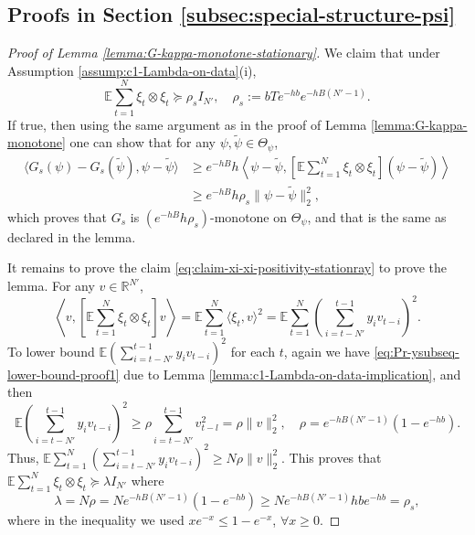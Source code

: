 \documentclass[11pt]{article}
\theoremstyle{remark}
\theoremstyle{plain}
\newcommand{\E}{\mathbb{E}}
\newcommand{\R}{\mathbb{R}}
\begin{document}
\subsection{Proofs in Section \ref{subsec:special-structure-psi}}
%
\begin{proof}[Proof of Lemma \ref{lemma:G-kappa-monotone-stationary}]
We claim that under Assumption \ref{assump:c1-Lambda-on-data}(i),
\begin{equation}\label{eq:claim-xi-xi-positivity-stationray}
\E  \sum_{t= 1}^N \xi_t \otimes \xi_t \succeq  \rho_s I_{N'},
\quad \rho_s := bT e^{-hb} e^{-hB (N'-1)}.
\end{equation}
If true, then using the same argument as in the proof of Lemma \ref{lemma:G-kappa-monotone} one can show that for any $\psi, \tilde \psi \in \Theta_\psi$,
\begin{align*}
\langle G_s(\psi) - G_s(\tilde \psi), \psi - \tilde \psi \rangle
& \ge e^{-hB} h  \left\langle  \psi - \tilde \psi,  \left[ \E \sum_{t=1}^N   \xi_t  \otimes \xi_t \right] (\psi - \tilde \psi) \right\rangle \\
& \ge e^{-hB} h  \rho_s \| \psi - \tilde \psi \|_2^2,
\end{align*}
which proves that $ G_s$ is $(e^{-hB} h  \rho_s)$-monotone on $\Theta_\psi$, and that is the same as declared in the lemma.

It remains to prove the claim \eqref{eq:claim-xi-xi-positivity-stationray} to prove the lemma. For any $v \in \R^{N'}$,
\[
\left\langle v,  \left[ \E  \sum_{t= 1}^N \xi_t \otimes \xi_t  \right] v \right\rangle
= \E \sum_{t=1}^N \langle \xi_t, v\rangle^2
= \E \sum_{t=1}^N \left(  \sum_{ i = t- N' }^{t-1}  y_i  v_{t-i} \right)^2.
\]
To lower bound $\E \left(  \sum_{ i = t- N' }^{t-1}  y_i  v_{t-i} \right)^2$ for each $t$,
again we have \eqref{eq:Pr-ysubseq-lower-bound-proof1} due to Lemma \ref{lemma:c1-Lambda-on-data-implication},
and then
\[
\E \left(  \sum_{ i = t- N' }^{t-1}  y_i  v_{t-i} \right)^2
\ge \rho \sum_{ i = t- N' }^{t-1} v_{t-l}^2
= \rho \| v\|_2^2,
\quad \rho = e^{-hB(N'-1)} (1- e^{-hb}) .
\]
Thus,
$\E \sum_{t=1}^N \left(  \sum_{ i = t- N' }^{t-1}  y_i  v_{t-i} \right)^2
\ge N \rho \| v\|_2^2 $.
This proves that $\E  \sum_{t= 1}^N \xi_t \otimes \xi_t \succeq \lambda I_{N'}$ where
\[
\lambda 
= N \rho 
= N e^{-hB(N'-1)} (1- e^{-hb}) 
\ge N e^{-hB(N'-1)} hb  e^{-hb} 
=  \rho_s,  
\]
where in the inequality we used 
 $ x e^{-x} \le 1-e^{-x} $, $\forall x \ge 0$. 
\end{proof}
\end{document}

